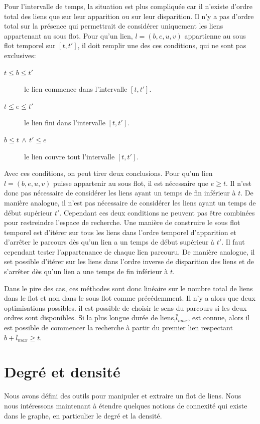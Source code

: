 Pour l'intervalle de temps, la situation est plus compliquée car il n'existe d'ordre total des liens que sur leur apparition ou sur leur disparition.
Il n'y a pas d'ordre total sur la présence qui permettrait de considérer uniquement les liens appartenant au sous flot.
Pour qu'un lien, $l= (b,e,u,v)$ appartienne au sous flot temporel sur $[t,t']$, il doit remplir une des ces conditions, qui ne sont pas exclusives:
\begin{description}
\item[$t \leq b \leq t'$] le lien commence dans l'intervalle $[t,t']$.
\item[$t \leq e \leq t'$] le lien fini dans l'intervalle $[t,t']$.
\item[$ b \leq t \, \wedge \, t' \leq e$] le lien couvre tout l'intervalle $[t,t']$.
\end{description}

Avec ces conditions, on peut tirer deux conclusions.
Pour qu'un lien $l=(b,e,u,v)$ puisse appartenir au sous flot, il est nécessaire que $e \geq t$.
Il n'est donc pas nécessaire de considérer les liens ayant un temps de fin inférieur à $t$.
De manière analogue, il n'est pas nécessaire de considérer les liens ayant un temps de début supérieur $t'$.
Cependant ces deux conditions ne peuvent pas être combinées pour restreindre l'espace de recherche.
Une manière de construire le sous flot temporel est d'itérer sur tous les liens dans l'ordre temporel d'apparition et d'arrêter le parcours dès qu'un lien a un temps de début supérieur à $t'$.
Il faut cependant tester l'appartenance de chaque lien parcouru.
De manière analogue, il set possible d'itérer sur les liens dans l'ordre inverse de disparition des liens et de s'arrêter dès qu'un lien a une temps de fin inférieur à $t$.


Dans le pire des cas, ces méthodes sont donc linéaire sur le nombre total de liens dans le flot et non dans le sous flot comme précédemment.
Il n'y a alors que deux optimisations possibles.
il est possible de choisir le sens du parcours si les deux ordres sont disponibles.
Si la plus longue durée de liens,$\bar{l}_{max}$, est connue, alors il est possible de commencer la recherche à partir du premier lien respectant $b+\bar{l}_{max} \geq t$.



\section{Degré et densité}
\label{sec:def_densite}
Nous avons défini des outils pour manipuler et extraire un flot de liens.
Nous nous intéressons maintenant à étendre quelques notions de connexité qui existe dans le graphe, en particulier le degré et la densité.

